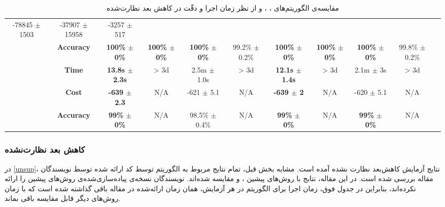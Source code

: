 {\begin{landscape}
\begin{table}[h]
\begin{latin}
\begin{tabular}{|c|c|c|c|c|c|c|c|c|c|c|}
		-78845 $\pm$ 1503 & 
		-37907 $\pm$ 15958 & 
		-3257 $\pm$ 517\\                  
		&
		\textbf{Accuracy} & 
		\textbf{100\%} $\pm$ \textbf{0\%} & 
		\textbf{100\%} $\pm$ \textbf{0\%} & 
		\textbf{100\%} $\pm$ \textbf{0\%} & 
		99.2\% $\pm$ 0.2\% & 
		\textbf{100\%} $\pm$ \textbf{0\%} & 
		\textbf{100\%} $\pm$ \textbf{0\%} & 
		\textbf{100\%} $\pm$ \textbf{0\%} & 
		99.8\% $\pm$ 0.2\% \\
		\hline
		\parbox[t]{1mm}{}&
		\textbf{Time} & 
		\textbf{13.8s $\pm$ 2.3s} &
		> 3d &
		2.5m $\pm$ 1.0s &
		> 3d &
		\textbf{12.1s $\pm$ 1.4s} & 
		> 3d &
		2.1m $\pm$ 3s &
		> 3d \\
		&
		\textbf{Cost} & 
		\textbf{-639 $\pm$ 2.3} &
		N/A &
		-621 $\pm$ 5.1 &
		N/A &
		\textbf{-639 $\pm$ 2} & 
		N/A &
		-620 $\pm$ 5.1 &
		N/A \\
		&
		\textbf{Accuracy} & 
		\textbf{99\%} $\pm$ \textbf{0\%} &
		N/A & 
		98.5\% $\pm$ 0.4\% & 
		N/A & 
		\textbf{99\%} $\pm$ \textbf{0\%} &
		N/A & 
		\textbf{99\%} $\pm$ \textbf{0\%} &
		N/A \\
		\hline
	\end{tabular}
	\end{latin}
	\caption{مقایسه‌ی الگوریتم‌های 
،
،
و
از نظر زمان اجرا و دقّت در کاهش بعد نظارت‌شده}
	\label{super}
\end{table}
\clearpage
\end{landscape}
}

\subsubsection{کاهش بعد نظارت‌نشده}
در 
\eqref{unsup}،
 نتایج آزمایش کاهش‌بعد نظارت نشده آمده است. مشابه بخش قبل،   تمام نتایج مربوط به الگوریتم 
توسط کد ارائه شده توسط نویسندگان مقاله بررسی شده است.  در این مقاله، نتابج
با روش‌های پیشین 
،
و 
مقایسه‌ شده‌اند. نویسندگان نسخه‌ی پیاده‌سازی‌شده‌ی روش‌های پیشین را ارائه نکرده‌اند، بنابراین در جدول فوق، زمان اجرا برای الگوریتم 
در هر آزمایش، همان زمان ارائه‌شده در مقاله باقی گذاشته شده است که با زمان روش‌های دیگر قابل مقایسه باقی‌ بماند.  


